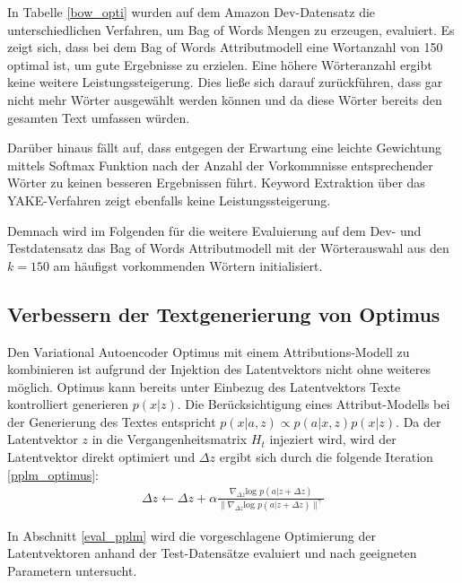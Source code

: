 In Tabelle \ref{bow_opti} wurden auf dem Amazon Dev-Datensatz die unterschiedlichen Verfahren, um Bag of Words Mengen zu erzeugen, evaluiert.
Es zeigt sich, dass bei dem Bag of Words Attributmodell eine Wortanzahl von 150 optimal ist, um gute Ergebnisse zu erzielen. 
Eine höhere Wörteranzahl ergibt keine weitere Leistungssteigerung. 
Dies ließe sich darauf zurückführen, dass gar nicht mehr Wörter ausgewählt werden können und da diese Wörter bereits den gesamten Text umfassen würden.

\pagebreak %
Darüber hinaus fällt auf, dass entgegen der Erwartung eine leichte Gewichtung mittels Softmax Funktion nach der Anzahl der Vorkommnisse entsprechender Wörter zu keinen besseren Ergebnissen führt.
Keyword Extraktion über das YAKE-Verfahren zeigt ebenfalls keine Leistungssteigerung. 

Demnach wird im Folgenden für die weitere Evaluierung auf dem Dev- und Testdatensatz das Bag of Words Attributmodell mit der Wörterauswahl aus den $k=150$ am häufigst vorkommenden Wörtern initialisiert.

\subsection{Verbessern der Textgenerierung von Optimus}
Den Variational Autoencoder Optimus mit einem Attributions-Modell zu kombinieren ist aufgrund der Injektion des Latentvektors nicht ohne weiteres möglich.
Optimus kann bereits unter Einbezug des Latentvektors Texte kontrolliert generieren $p(x|z)$.
Die Berücksichtigung eines Attribut-Modells bei der Generierung des Textes entspricht $p(x|a,z) \propto p(a|x,z)p(x|z)$. %
Da der Latentvektor $z$ in die Vergangenheitsmatrix $H_t$ injeziert wird, wird der Latentvektor direkt optimiert und $\Delta z$ ergibt sich durch die folgende Iteration \ref{pplm_optimus}:
\begin{align}
    \label{pplm_optimus}
    \Delta z \leftarrow \Delta z + \alpha \frac{\nabla_{\Delta z} \text{log }p(a|z+\Delta z)}{\| \nabla_{\Delta z} \text{log }p(a|z+\Delta z)\|^\gamma}
\end{align}

In Abschnitt \ref*{eval_pplm} wird die vorgeschlagene Optimierung der Latentvektoren anhand der Test-Datensätze evaluiert und nach geeigneten Parametern untersucht.

\pagebreak %
